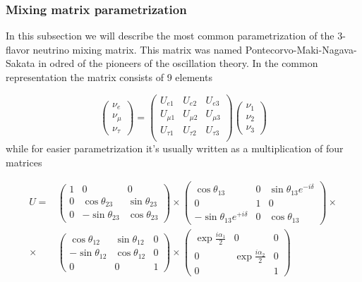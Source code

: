 \documentclass[../main.tex]{subfiles}
\begin{document}
\subsubsection{Mixing matrix parametrization}
In this subsection we will describe the most common parametrization of the 3-flavor neutrino mixing matrix. This matrix was named Pontecorvo-Maki-Nagava-Sakata in odred of the pioneers of the oscillation theory. In the common representation the matrix consists of 9 elements

\begin{equation}
\begin{pmatrix}
\nu_e \\ \nu_\mu \\ \nu_\tau
\end{pmatrix}
=
\begin{pmatrix}
U_{e1} & U_{e2} & U_{e3} \\
U_{\mu 1} & U_{\mu 2} & U_{\mu 3} \\
U_{\tau 1} & U_{\tau 2} & U_{\tau 3} \\
\end{pmatrix}
\begin{pmatrix}
\nu_1 \\ \nu_2 \\ \nu_3
\end{pmatrix}
\end{equation}
while for easier parametrization it's usually written as a multiplication of four matrices

\begin{align}
\nonumber
U=&
\begin{pmatrix}
1   & 0                 & 0 \\
0   & \cos\theta_{23}   & \sin\theta_{23} \\
0   & -\sin\theta_{23}  & \cos\theta_{23}
\end{pmatrix}
\times
\begin{pmatrix}
\cos\theta_{13}                           & 0     & \sin\theta_{13}e^{-i\delta} \\
0                                         & 1     & 0 \\
-\sin\theta_{13}e^{+i\delta}              & 0     & \cos\theta_{13}
\end{pmatrix} \times \\
\times &
\begin{pmatrix}
\cos\theta_{12}   & \sin\theta_{12} & 0 \\
-\sin\theta_{12}  & \cos\theta_{12} & 0 \\
0                 & 0               & 1
\end{pmatrix}
\times
\begin{pmatrix}
\exp\frac{i\alpha_1}{2}   & 0                         & 0 \\
0                         & \exp\frac{i\alpha_2}{2}   & 0 \\
0                         &                           & 1
\end{pmatrix}
\end{align}
\end{document}
